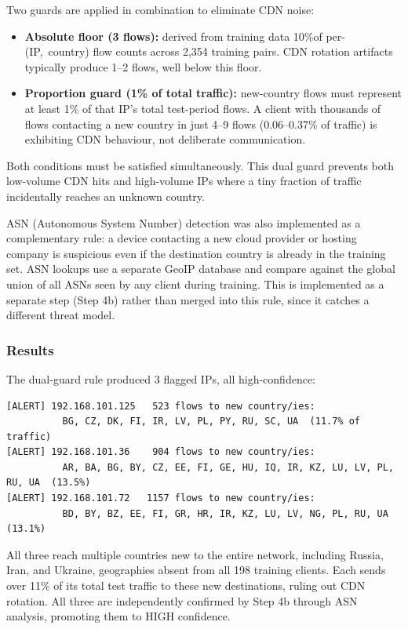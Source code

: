 \documentclass[
  11pt,
]{article}
\begin{document}
Two guards are applied in combination to eliminate CDN noise:

\begin{itemize}
  \item \textbf{Absolute floor (3 flows):} derived from training data 10\%of per-(IP,~country) flow counts across 2,354 training pairs. CDN rotation artifacts typically produce 1--2 flows, well below this floor.
  \item \textbf{Proportion guard (1\% of total traffic):} new-country flows must represent at least 1\% of that IP's total test-period flows. A client with thousands of flows contacting a new country in just 4--9 flows (0.06--0.37\% of traffic) is exhibiting CDN behaviour, not deliberate communication.
\end{itemize}

Both conditions must be satisfied simultaneously. This dual guard prevents both low-volume CDN hits and high-volume IPs where a tiny fraction of traffic incidentally reaches an unknown country.

ASN (Autonomous System Number) detection was also implemented as a
complementary rule: a device contacting a new cloud provider or hosting
company is suspicious even if the destination country is already in the
training set. ASN lookups use a separate GeoIP database and compare
against the global union of all ASNs seen by any client during training.
This is implemented as a separate step (Step 4b) rather than merged into
this rule, since it catches a different threat model.

\subsubsection{Results}



The dual-guard rule produced 3 flagged IPs, all high-confidence:

\begin{verbatim}
[ALERT] 192.168.101.125   523 flows to new country/ies:
          BG, CZ, DK, FI, IR, LV, PL, PY, RU, SC, UA  (11.7% of traffic)
[ALERT] 192.168.101.36    904 flows to new country/ies:
          AR, BA, BG, BY, CZ, EE, FI, GE, HU, IQ, IR, KZ, LU, LV, PL, RU, UA  (13.5%)
[ALERT] 192.168.101.72   1157 flows to new country/ies:
          BD, BY, BZ, EE, FI, GR, HR, IR, KZ, LU, LV, NG, PL, RU, UA  (13.1%)
\end{verbatim}

All three reach multiple countries new to the entire network, including
Russia, Iran, and Ukraine, geographies absent from all 198 training
clients. Each sends over 11\% of its total test traffic to these new
destinations, ruling out CDN rotation. All three are independently
confirmed by Step 4b through ASN analysis, promoting them to HIGH
confidence.
\end{document}
